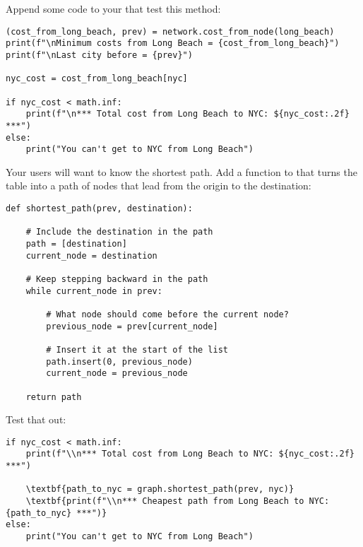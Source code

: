 Append some code to your  that test this method:

\begin{verbatim}
(cost_from_long_beach, prev) = network.cost_from_node(long_beach)
print(f"\nMinimum costs from Long Beach = {cost_from_long_beach}")
print(f"\nLast city before = {prev}")

nyc_cost = cost_from_long_beach[nyc]

if nyc_cost < math.inf:
    print(f"\n*** Total cost from Long Beach to NYC: ${nyc_cost:.2f} ***")
else:
    print("You can't get to NYC from Long Beach")
\end{verbatim}

Your users will want to know the shortest path.  Add a function to
 that turns the  table into a path of
nodes that lead from the origin to the destination:

\begin{verbatim}
def shortest_path(prev, destination):

    # Include the destination in the path
    path = [destination]
    current_node = destination

    # Keep stepping backward in the path
    while current_node in prev:

        # What node should come before the current node?
        previous_node = prev[current_node]

        # Insert it at the start of the list
        path.insert(0, previous_node)
        current_node = previous_node

    return path
\end{verbatim}

Test that out:

\begin{Verbatim}[commandchars=\\\{\}]
if nyc_cost < math.inf:
    print(f"\\n*** Total cost from Long Beach to NYC: ${nyc_cost:.2f} ***")

    \textbf{path_to_nyc = graph.shortest_path(prev, nyc)}
    \textbf{print(f"\\n*** Cheapest path from Long Beach to NYC: {path_to_nyc} ***")}
else:
    print("You can't get to NYC from Long Beach")
\end{Verbatim}
